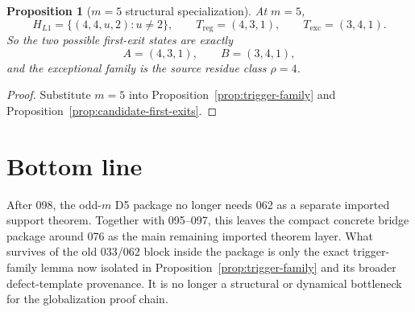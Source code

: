 \documentclass[11pt]{article}
\newtheorem{proposition}[theorem]{Proposition}
\begin{document}
\begin{proposition}[$m=5$ structural specialization]
At $m=5$,
\[
H_{L1}=\{(4,4,u,2):u\neq 2\},
\qquad
T_{\mathrm{reg}}=(4,3,1),
\qquad
T_{\mathrm{exc}}=(3,4,1).
\]
So the two possible first-exit states are exactly
\[
A=(4,3,1),
\qquad
B=(3,4,1),
\]
and the exceptional family is the source residue class $\rho=4$.
\end{proposition}

\begin{proof}
Substitute $m=5$ into Proposition~\ref{prop:trigger-family} and
Proposition~\ref{prop:candidate-first-exits}.
\end{proof}

\section{Bottom line}

After 098, the odd-$m$ D5 package no longer needs 062 as a separate imported
support theorem. Together with 095--097, this leaves the compact concrete
bridge package around 076 as the main remaining imported theorem layer.
What survives of the old 033/062 block inside the package is only the exact
trigger-family lemma now isolated in Proposition~\ref{prop:trigger-family} and
its broader defect-template provenance. It is no longer a structural or
dynamical bottleneck for the globalization proof chain.
\end{document}
